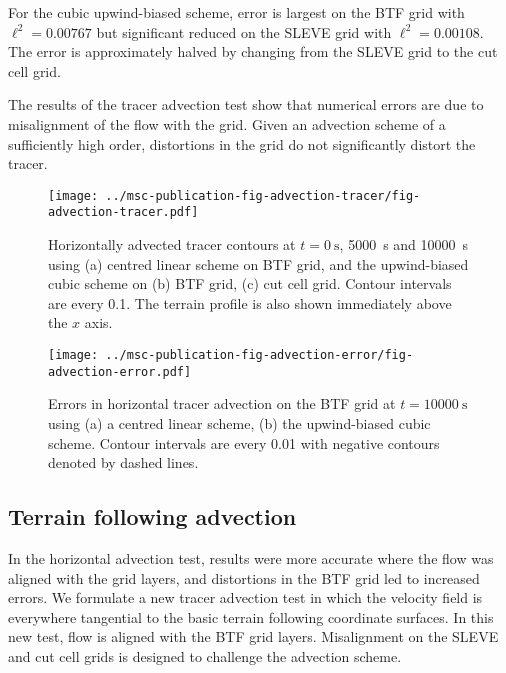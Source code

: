 \documentclass[twocol]{ametsoc}
\begin{document}
For the cubic upwind-biased scheme, error is largest on the BTF grid with \(\ell^2 = \num{0.00767}\) but significant reduced on the SLEVE grid with \(\ell^2 = \num{0.00108}\).  The error is approximately halved by changing from the SLEVE grid to the cut cell grid.

The results of the tracer advection test show that numerical errors are due to misalignment of the flow with the grid.  Given an advection scheme of a sufficiently high order, distortions in the grid do not significantly distort the tracer.

\begin{figure}
	\centering
	\texttt{[image: ../msc-publication-fig-advection-tracer/fig-advection-tracer.pdf]}
%
	\caption{Horizontally advected tracer contours at \(t = \SI{0}{\second}\), \SI{5000}{\second} and \SI{10000}{\second} using (a) centred linear scheme on BTF grid, and the upwind-biased cubic scheme on (b) BTF grid, (c) cut cell grid.  Contour intervals are every 0.1.  The terrain profile is also shown immediately above the $x$ axis.}
	\label{fig:advection-tracer}
\end{figure}

\begin{figure}
	\centering
	\texttt{[image: ../msc-publication-fig-advection-error/fig-advection-error.pdf]}
	\caption{Errors in horizontal tracer advection on the BTF grid at \(t = \SI{10000}{\second}\) using (a) a centred linear scheme, (b) the upwind-biased cubic scheme.  Contour intervals are every 0.01 with negative contours denoted by dashed lines.}
	\label{fig:advection-error}
\end{figure}

\subsection{Terrain following advection}
In the horizontal advection test, results were more accurate where the flow was aligned with the grid layers, and distortions in the BTF grid led to increased errors.  We formulate a new tracer advection test in which the velocity field is everywhere tangential to the basic terrain following coordinate surfaces.  In this new test, flow is aligned with the BTF grid layers.  Misalignment on the SLEVE and cut cell grids is designed to challenge the advection scheme.
\end{document}
